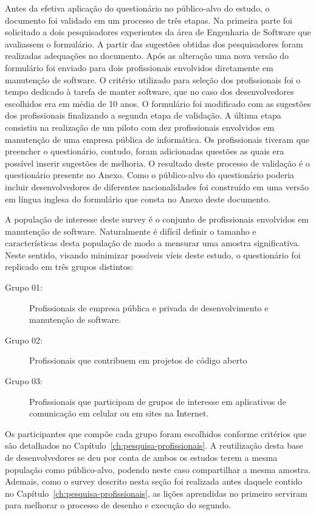 Antes da efetiva aplicação do questionário no público-alvo do estudo, o
documento foi validado em um processo de três etapas. Na primeira parte foi
solicitado a dois pesquisadores experientes da área de Engenharia de Software
que avaliassem o formulário. A partir das sugestões obtidas dos pesquisadores
foram realizadas adequações no documento. Após as alteração uma nova versão do
formulário foi enviado para dois profissionais envolvidos diretamente em
manutenção de software. O critério utilizado para seleção dos profissionais foi
o tempo dedicado à tarefa de manter software, que no caso dos desenvolvedores
escolhidos era em média de 10 anos. O formulário foi modificado com as sugestões
dos profissionais finalizando a segunda etapa de validação. A última etapa
consistiu na realização de um piloto com dez profissionais envolvidos em
manutenção de uma empresa pública de informática. Os profissionais tiveram que
preencher o questionário, contudo, foram adicionadas questões as quais era
possível inserir sugestões de melhoria. O resultado deste processo de validação
é o questionário presente no Anexo. Como o público-alvo do questionário poderia
incluir desenvolvedores de diferentes nacionalidades foi construído em uma
versão em língua inglesa do formulário que consta no Anexo deste documento.


A população de interesse deste survey é o conjunto de profissionais envolvidos
em manutenção de software. Naturalmente é difícil definir o tamanho e
características desta população de modo a mensurar uma amostra significativa.
Neste sentido, visando minimizar possíveis víeis deste estudo, o questionário
foi replicado em três grupos distintos:

\begin{description}
	\item[Grupo 01:] Profissionais de empresa pública e privada de
			desenvolvimento e manutenção de software.
	\item[Grupo 02:] Profissionais que contribuem em projetos de
		código aberto
   	\item[Grupo 03:] Profissionais que participam de grupos de
		interesse em aplicativos de comunicação em celular ou em sites na
		Internet.
\end{description}

Os participantes que compõe cada grupo foram escolhidos conforme critérios que
são detalhados no Capítulo~\ref{ch:pesquisa-profissionais}. A reutilização desta
base de desenvolvedores se deu por conta de ambos os estudos terem a mesma
população como público-alvo, podendo neste caso compartilhar a mesma amostra.
Ademais, como o survey descrito nesta seção foi realizada antes daquele contido
no Capítulo~\ref{ch:pesquisa-profissionais}, as lições aprendidas no primeiro
serviram para melhorar o processo de desenho e execução do segundo.

